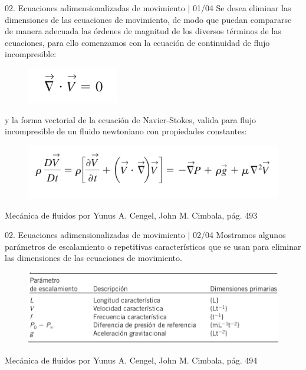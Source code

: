 
\begin{frame}{02. Ecuaciones adimensionalizadas de movimiento | 01/04}
\justifying
Se desea eliminar las dimensiones de las ecuaciones de movimiento, de modo que puedan compararse de manera adecuada las órdenes de magnitud de los diversos términos de las ecuaciones, para ello comenzamos con la ecuación de continuidad de flujo incompresible:
\begin{figure}[H]
\centering
\includegraphics[scale=0.2]{Section_Files/S3-imagenes-Jhon/0004.png}
\end{figure}
y la forma vectorial de la ecuación de Navier-Stokes, valida para flujo incompresible de un fluido newtoniano con propiedades constantes:
\begin{figure}[H]
\centering
\includegraphics[scale=0.2]{Section_Files/S3-imagenes-Jhon/0005.png}
\end{figure}
{\tiny Mecánica de fluidos por Yunus A. Cengel, John M. Cimbala, pág. 493}
\end{frame}

\begin{frame}{02. Ecuaciones adimensionalizadas de movimiento | 02/04}
\justifying
Mostramos algunos parámetros de escalamiento o repetitivas característicos que se usan para eliminar las dimensiones de las ecuaciones de movimiento.
\begin{figure}[H]
\centering
\includegraphics[scale=0.3]{Section_Files/S3-imagenes-Jhon/0006.png}
\end{figure}
{\tiny Mecánica de fluidos por Yunus A. Cengel, John M. Cimbala, pág. 494}
\end{frame}

